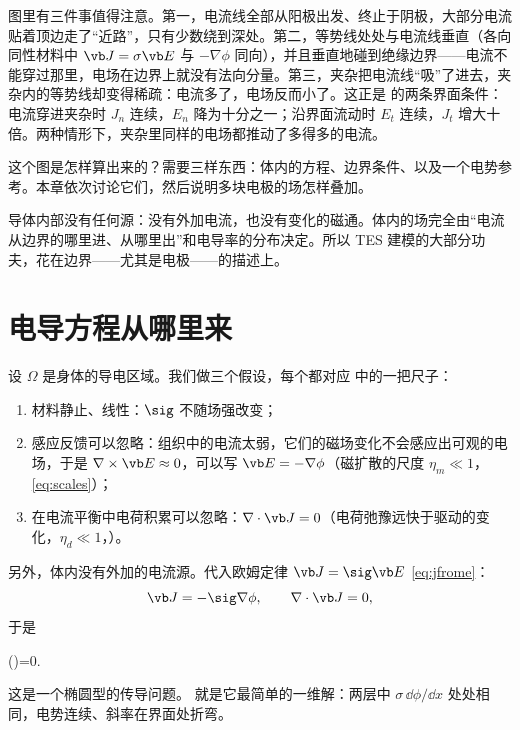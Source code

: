图里有三件事值得注意。第一，电流线全部从阳极出发、终止于阴极，大部分电流贴着顶边走了“近路”，只有少数绕到深处。第二，等势线处处与电流线垂直（各向同性材料中 $\vb J=\sigma\vb E$ 与 $-\nabla\phi$ 同向），并且垂直地碰到绝缘边界——电流不能穿过那里，电场在边界上就没有法向分量。第三，夹杂把电流线“吸”了进去，夹杂内的等势线却变得稀疏：电流多了，电场反而小了。这正是 的两条界面条件：电流穿进夹杂时 $J_n$ 连续，$E_n$ 降为十分之一；沿界面流动时 $E_t$ 连续，$J_t$ 增大十倍。两种情形下，夹杂里同样的电场都推动了多得多的电流。

这个图是怎样算出来的？需要三样东西：体内的方程、边界条件、以及一个电势参考。本章依次讨论它们，然后说明多块电极的场怎样叠加。

\begin{intuition}
导体内部没有任何源：没有外加电流，也没有变化的磁通。体内的场完全由“电流从边界的哪里进、从哪里出”和电导率的分布决定。所以 TES 建模的大部分功夫，花在边界——尤其是电极——的描述上。
\end{intuition}

\section{电导方程从哪里来}\label{sec:tes-pde}

设 $\Omega$ 是身体的导电区域。我们做三个假设，每个都对应 中的一把尺子：
\begin{enumerate}
\item 材料静止、线性：$\sig$ 不随场强改变；
\item 感应反馈可以忽略：组织中的电流太弱，它们的磁场变化不会感应出可观的电场，于是 $\nabla\times\vb E\approx0$，可以写 $\vb E=-\nabla\phi$（磁扩散的尺度 $\eta_m\ll1$，\eqref{eq:scales}）；
\item 在电流平衡中电荷积累可以忽略：$\nabla\cdot\vb J=0$（电荷弛豫远快于驱动的变化，$\eta_d\ll1$，）。
\end{enumerate}
另外，体内没有外加的电流源。代入欧姆定律 $\vb J=\sig\vb E$ \eqref{eq:jfrome}：
\begin{equation}
\vb J=-\sig\nabla\phi,\qquad \nabla\cdot\vb J=0,
\end{equation}
于是
\begin{keyeq}
\nabla\cdot(\sig\nabla\phi)=0\qquad{}\Omega{}.
\label{eq:tespde}
\end{keyeq}
这是一个椭圆型的传导问题。 就是它最简单的一维解：两层中 $\sigma\,\dd\phi/\dd x$ 处处相同，电势连续、斜率在界面处折弯。

